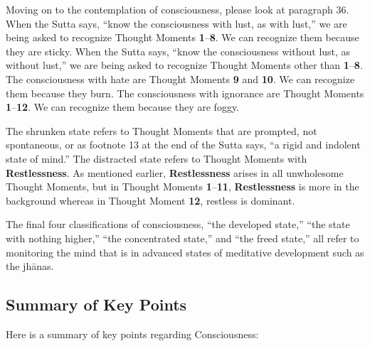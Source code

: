 Moving on to the contemplation of consciousness, please look at paragraph 36. When the Sutta says, “know the consciousness with lust, as with lust,” we are being asked to recognize Thought Moments \textbf{1}--\textbf{8}. We can recognize them because they are sticky. When the Sutta says, “know the consciousness without lust, as without lust,” we are being asked to recognize Thought Moments other than \textbf{1}--\textbf{8}. The consciousness with hate are Thought Moments \textbf{9} and \textbf{10}. We can recognize them because they burn. The consciousness with ignorance are Thought Moments \textbf{1}--\textbf{12}. We can recognize them because they are foggy.

The shrunken state refers to Thought Moments that are prompted, not spontaneous, or as footnote 13 at the end of the Sutta says, “a rigid and indolent state of mind.” The distracted state refers to Thought Moments with \textbf{Restlessness}. As mentioned earlier, \textbf{Restlessness} arises in all unwholesome Thought Moments, but in Thought Moments \textbf{1}--\textbf{11}, \textbf{Restlessness} is more in the background whereas in Thought Moment \textbf{12}, restless is dominant.

The final four classifications of consciousness, “the developed state,” “the state with nothing higher,” “the concentrated state,” and “the freed state,” all refer to monitoring the mind that is in advanced states of meditative development such as the jhānas.

\subsection*{Summary of Key Points}

Here is a summary of key points regarding Consciousness:

